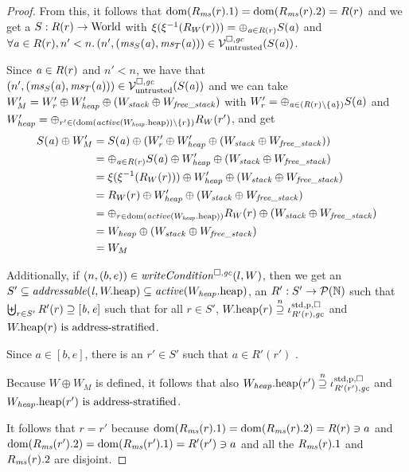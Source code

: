 \begin{proof}
  From this, it follows that $\dom(R_\ms(r).1) = \dom(R_\ms(r).2) = R(r)$ and we get a $S : R(r) \fun \World$ with $\xi(\xi^{-1}(R_W(r))) = \oplus_{\aaddr \in R(r)} S(\aaddr)$ and $\forall \aaddr \in R(r),n' < n \ldotp \npair[n']{(\ms_S(\aaddr),\ms_T(\aaddr))} \in \lrv(S(\aaddr))$.

  Since $\aaddr \in R(r)$ and $n' < n$, we have that $\npair[n']{(\ms_S(\aaddr),\ms_T(\aaddr))} \in \lrv(S(\aaddr))$ and
  we can take $W_M' = W_r' \oplus W_{\var{heap}}' \oplus (W_{\var{stack}} \oplus W_{\var{free\_stack}})$ with $W_r' = \oplus_{\aaddr \in (R(r)\setminus \{\aaddr\})} S(\aaddr)$ and $W_\var{heap}' = \oplus_{r' \in (\dom(\activeReg{\pwheap[W_\var{heap}]})\setminus \{r\})} R_W(r')$, and get
  \begin{align*}
    S(\aaddr) \oplus W_M'
    &=S(\aaddr) \oplus (W_r' \oplus W_\var{heap}'\oplus (W_{\var{stack}} \oplus W_{\var{free\_stack}}))\\
    &=
    \oplus_{\aaddr \in R(r)} S(\aaddr) \oplus W_{\var{heap}}'\oplus (W_{\var{stack}} \oplus W_{\var{free\_stack}})\\
    &=
    \xi(\xi^{-1}(R_W(r))) \oplus W_\var{heap}'\oplus (W_{\var{stack}} \oplus W_{\var{free\_stack}})\\
    &=
    R_W(r) \oplus W_\var{heap}'\oplus (W_{\var{stack}} \oplus W_{\var{free\_stack}})\\
    &=
    \oplus_{r \in \dom(\activeReg{\pwheap[W_\var{heap}]})} R_W(r)\oplus (W_{\var{stack}} \oplus W_{\var{free\_stack}})\\
    &=
      W_\var{heap} \oplus (W_{\var{stack}} \oplus W_{\var{free\_stack}})\\
      &= W_M
  \end{align*}

  Additionally, if $\npair{(b,e)}\in\writeCond{l,W}$, then
  we get an $S'\subseteq \addressable{\lin, \pwheap} \subseteq \activeReg{\pwheap[W_\var{heap}]}$, an $R' : S' \fun \powerset{\nats}$ such that $\biguplus_{r \in S'} R'(r) \supseteq [\baddr,\eaddr]$ such that
  for all $r \in S'$, $\pwheap(r) \nsupeq \stdreg{R'(r),\gc}{\pur}$ and
  $\pwheap(r) \text{ is address-stratified}$.

  Since $a \in [b,e]$, there is an $r' \in S'$ such that $a \in R'(r')$ .
  
  Because $W \oplus W_M$ is defined, it follows that also 
  $\pwheap[W_\var{heap}](r') \nsupeq \stdreg{R'(r'),\gc}{\pur}$ and
  $\pwheap[W_\var{heap}](r') \text{ is address-stratified}$.

  It follows that $r = r'$ because $\dom(R_\ms(r).1) = \dom(R_\ms(r).2) = R(r) \ni a$ and $\dom(R_\ms(r').2) = \dom(R_\ms(r').1) = R'(r') \ni a$ and all the $R_\ms(r).1$ and $R_\ms(r).2$ are disjoint.


\end{proof}
